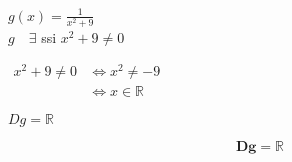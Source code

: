 \documentclass[a4paper,12pt]{article}
\begin{document}
$g(x) = \frac{1}{x^{2}+9}$\\[0.2cm]
$g \quad \exists $ ssi  $ x^{2}+9 \neq 0 $

$\begin{aligned}
    x^{2}+9 \neq 0  &\iff x^{2} \neq -9\\
                &\iff x \in \mathbb{R}
\end{aligned}$

$Dg=\mathbb{R}$

    \begin{tcolorbox}[colback=green!20, colframe=green!80, sharp corners]
        \[
        \mathbf{Dg=\mathbb{R}}
        \]
    \end{tcolorbox}
\end{document}
